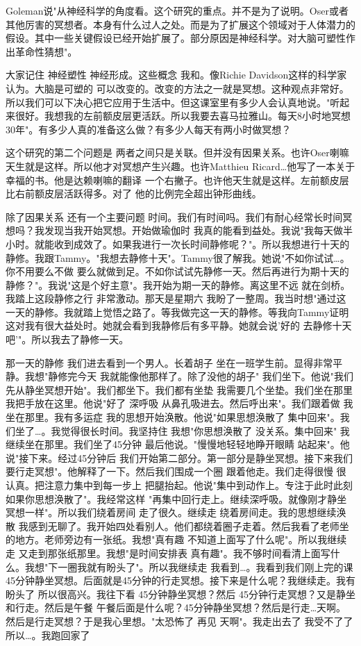 Goleman说"从神经科学的角度看。这个研究的重点。并不是为了说明。Oser或者其他厉害的冥想者。本身有什么过人之处。而是为了扩展这个领域对于人体潜力的假设。其中一些关键假设已经开始扩展了。部分原因是神经科学。对大脑可塑性作出革命性猜想"。 

大家记住 神经塑性 神经形成。这些概念 我和。像Richie Davidson这样的科学家认为。大脑是可塑的 可以改变的。改变的方法之一就是冥想。这种观点非常好。所以我们可以下决心把它应用于生活中。但这课室里有多少人会认真地说。"听起来很好。我想我的左前额皮层更活跃。所以我要去喜马拉雅山。每天8小时地冥想30年"。有多少人真的准备这么做？有多少人每天有两小时做冥想？ 

这个研究的第二个问题是 两者之间只是关联。但并没有因果关系。也许Oser喇嘛天生就是这样。所以他才对冥想产生兴趣。也许Matthieu Ricard…他写了一本关于幸福的书。他是达赖喇嘛的翻译 一个右撇子。也许他天生就是这样。左前额皮层比右前额皮层活跃得多。对了 他的比例完全超出钟形曲线。 

除了因果关系 还有一个主要问题 时间。我们有时间吗。我们有耐心经常长时间冥想吗？我发现当我开始冥想。开始做瑜伽时 我真的能看到益处。我说"我每天做半小时。就能收到成效了。如果我进行一次长时间静修呢？"。所以我想进行十天的静修。我跟Tammy。"我想去静修十天"。Tammy很了解我。她说"不如你试试…。你不用要么不做 要么就做到足。不如你试试先静修一天。然后再进行为期十天的静修？"。我说"这是个好主意"。我开始为期一天的静修。离这里不远 就在剑桥。我踏上这段静修之行 非常激动。那天是星期六 我盼了一整周。我当时想"通过这一天的静修。我就踏上觉悟之路了。等我做完这一天的静修。等我向Tammy证明这对我有很大益处时。她就会看到我静修后有多平静。她就会说'好的 去静修十天吧'"。所以我去了静修一天。 

那一天的静修 我们进去看到一个男人。长着胡子 坐在一班学生前。显得非常平静。我想"静修完今天 我就能像他那样了。除了没他的胡子" 我们坐下。他说"我们先从静坐冥想开始"。我们都坐下。我们都有坐垫 我需要几个坐垫。我们坐在那里 我把手放在这里。他说"好了 深呼吸 从鼻孔吸进去。然后呼出来"。我们跟着做 我坐在那里。我有多运症 我的思想开始涣散。他说"如果思想涣散了 集中回来"。我们坐了…。我觉得很长时间。我坚持住 我想"你思想涣散了 没关系。集中回来" 我继续坐在那里。我们坐了45分钟 最后他说。"慢慢地轻轻地睁开眼睛 站起来"。他说"接下来。经过45分钟后 我们开始第二部分。第一部分是静坐冥想。接下来我们要行走冥想"。他解释了一下。然后我们围成一个圈 跟着他走。我们走得很慢 很认真。把注意力集中到每一步上 把腿抬起。他说"集中到动作上。专注于此时此刻 如果你思想涣散了"。我经常这样 "再集中回行走上。继续深呼吸。就像刚才静坐冥想一样"。所以我们绕着房间 走了很久。继续走 绕着房间走。我的思想继续涣散 我感到无聊了。我开始四处看别人。他们都绕着圈子走着。然后我看了老师坐的地方。老师旁边有一张纸。我想"真有趣 不知道上面写了什么呢"。所以我继续走 又走到那张纸那里。我想"是时间安排表 真有趣"。我不够时间看清上面写什么。我想"下一圈我就有盼头了"。所以我继续走 我看到…。我看到我们刚上完的课 45分钟静坐冥想。后面就是45分钟的行走冥想。接下来是什么呢？我继续走。我有盼头了 所以很高兴。我往下看 45分钟静坐冥想？然后 45分钟行走冥想？又是静坐和行走。然后是午餐 午餐后面是什么呢？45分钟静坐冥想？然后是行走…天啊。然后是行走冥想？于是我心里想。"太恐怖了 再见 天啊"。我走出去了 我受不了了 所以…。我跑回家了 

